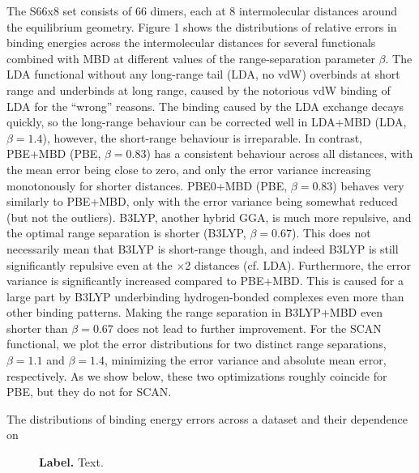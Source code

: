 The S66x8 set consists of 66 dimers, each at 8 intermolecular distances around the equilibrium geometry.
Figure 1 shows the distributions of relative errors in binding energies across the intermolecular distances for several functionals combined with MBD at different values of the range-separation parameter $\beta$.
The LDA functional without any long-range tail (LDA, no vdW) overbinds at short range and underbinds at long range, caused by the notorious vdW binding of LDA for the ``wrong'' reasons.
The binding caused by the LDA exchange decays quickly, so the long-range behaviour can be corrected well in LDA+MBD (LDA, $\beta=1.4$), however, the short-range behaviour is irreparable.
In contrast, PBE+MBD (PBE, $\beta=0.83$) has a consistent behaviour across all distances, with the mean error being close to zero, and only the error variance increasing monotonously for shorter distances.
PBE0+MBD (PBE, $\beta=0.83$) behaves very similarly to PBE+MBD, only with the error variance being somewhat reduced (but not the outliers).
B3LYP, another hybrid GGA, is much more repulsive, and the optimal range separation is shorter (B3LYP, $\beta=0.67$).
This does not necessarily mean that B3LYP is short-range though, and indeed B3LYP is still significantly repulsive even at the $\times$2 distances (cf. LDA).
Furthermore, the error variance is significantly increased compared to PBE+MBD\@.
This is caused for a large part by B3LYP underbinding hydrogen-bonded complexes even more than other binding patterns.
Making the range separation in B3LYP+MBD even shorter than $\beta=0.67$ does not lead to further improvement.
For the SCAN functional, we plot the error distributions for two distinct range separations, $\beta=1.1$ and $\beta=1.4$, minimizing the error variance and absolute mean error, respectively.
As we show below, these two optimizations roughly coincide for PBE, but they do not for SCAN\@.






The distributions of binding energy errors across a dataset and their dependence on 




\begin{figure}
\caption{\textbf{Label.}
Text.
\label{fig:s66-dists}
}
\end{figure}

